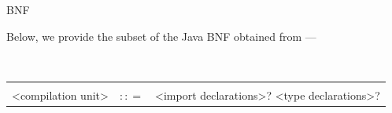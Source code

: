 \documentclass[landscape, 11pt]{article}
\begin{document}
\begin{qsection}{BNF}

	Below, we provide the subset of the Java BNF obtained from ---
	 \br

	\begin{enumerate}[label=\bt{\theenumi.}]
		\tt
		\ditem[Programs.]

			\begin{longtable}{R{7cm} c L{15cm}}
													&					&	 \\
				<compilation unit>							&	$\colon\colon=$	&	<import declarations>? <type declarations>?
			\end{longtable}

		\ditem[Declarations.]


\end{enumerate}
\end{qsection}
\end{document}
